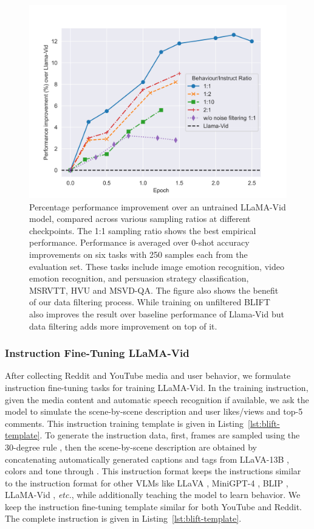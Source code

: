 \begin{figure}
    \centering
    \includegraphics[width=0.9\linewidth]{images/performance_vs_epoch.png}
    \caption{Percentage performance improvement over an untrained LLaMA-Vid model, compared across various sampling ratios at different checkpoints. The 1:1 sampling ratio shows the best empirical performance. Performance is averaged over 0-shot accuracy improvements on six tasks with 250 samples each from the evaluation set. These tasks include image emotion recognition, video emotion recognition, and persuasion strategy classification, MSRVTT, HVU and MSVD-QA. The figure also shows the benefit of our data filtering process. While training on unfiltered BLIFT also improves the result over baseline performance of Llama-Vid but data filtering adds more improvement on top of it.}
    \label{fig:eval-ablation}
\end{figure}


\subsubsection{Instruction Fine-Tuning LLaMA-Vid}
After collecting Reddit and YouTube media and user behavior, we formulate instruction fine-tuning tasks for training LLaMA-Vid. In the training instruction, given the media content and automatic speech recognition if available, we ask the model to simulate the scene-by-scene description and user likes/views and top-5 comments. This instruction training template is given in Listing~\ref{lst:blift-template}. 
To generate the instruction data, first, frames are sampled using the 30-degree rule \cite{si2023long,arev2014automatic,friedman2004knowledge}, then the scene-by-scene description are obtained by concatenating automatically generated captions and tags from LLaVA-13B \cite{liu2023visual}, colors and tone through \citet{qin2020u2}. This instruction format keeps the instructions similar to the instruction format for other VLMs like LLaVA \cite{liu2023visual}, MiniGPT-4 \cite{zhu2023minigpt}, BLIP \cite{li2022blip}, LLaMA-Vid \cite{li2023llamavid}, \textit{etc.}, while additionally teaching the model to learn behavior. We keep the instruction fine-tuning template similar for both YouTube and Reddit. The complete instruction is given in Listing~\ref{lst:blift-template}. 



